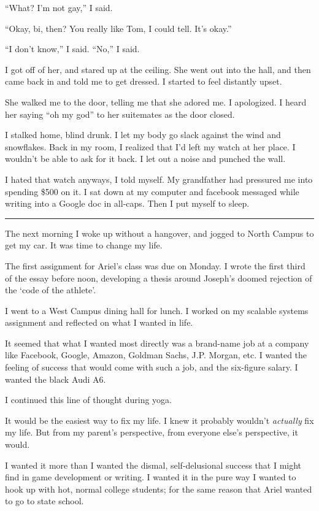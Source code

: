 ``What?  I'm not gay,'' I said.

``Okay, bi, then?  You really like Tom, I could tell.  It's okay.''

``I don't know,'' I said.  ``No,'' I said.

I got off of her, and stared up at the ceiling.  She went out into the hall, and
then came back in and told me to get dressed.  I started to feel distantly
upset.

She walked me to the door, telling me that she adored me.  I apologized.  I
heard her saying ``oh my god'' to her suitemates as the door closed. 

I stalked home, blind drunk.  I let my body go slack against the wind and
snowflakes.  Back in my room, I realized that I'd left my watch at her place.  I
wouldn't be able to ask for it back.  I let out a noise and punched the wall. 

I hated that watch anyways, I told myself.  My grandfather had pressured me into
spending \$500 on it.   I sat down at my computer and facebook messaged while
writing into a Google doc in all-caps.  Then I put myself to sleep.

\plainfancybreak{12pt}{2}{}

The next morning I woke up without a hangover, and jogged to North Campus to get
my car.  It was time to change my life.

The first assignment for Ariel's class was due on Monday.  I wrote the first
third of the essay before noon, developing a thesis around Joseph's doomed
rejection of the `code of the athlete'.

I went to a West Campus dining hall for lunch.  I worked on my scalable systems
assignment and reflected on what I wanted in life.

It seemed that what I wanted most directly was a brand-name job at a company
like Facebook, Google, Amazon, Goldman Sachs, J.P.  Morgan, etc.  I wanted the
feeling of success that would come with such a job, and the six-figure salary.
I wanted the black Audi A6.

I continued this line of thought during yoga.

It would be the easiest way to fix my life.  I knew it probably wouldn't
\textit{actually} fix my life.  But from my parent's perspective, from everyone
else's perspective, it would.  

I wanted it more than I wanted the dismal, self-delusional success that I might
find in game development or writing.  I wanted it in the pure way I wanted to
hook up with hot, normal college students; for the same reason that Ariel
wanted to go to state school. 

